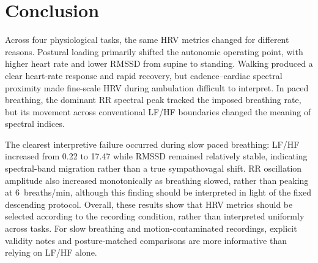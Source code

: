 \documentclass[conference]{IEEEtran}
\begin{document}
\section{Conclusion}
\label{sec:conclusion}

Across four physiological tasks, the same HRV metrics changed for
different reasons. Postural loading primarily shifted the autonomic
operating point, with higher heart rate and lower RMSSD from supine to
standing. Walking produced a clear heart-rate response and rapid
recovery, but cadence--cardiac spectral proximity made fine-scale HRV
during ambulation difficult to interpret. In paced breathing, the
dominant RR spectral peak tracked the imposed breathing rate, but its
movement across conventional LF/HF boundaries changed the meaning of
spectral indices.

The clearest interpretive failure occurred during slow paced breathing:
LF/HF increased from 0.22 to 17.47 while RMSSD remained relatively
stable, indicating spectral-band migration rather than a true
sympathovagal shift. RR oscillation amplitude also increased
monotonically as breathing slowed, rather than peaking at
6~breaths/min, although this finding should be interpreted in light of
the fixed descending protocol. Overall, these results show that HRV
metrics should be selected according to the recording condition,
rather than interpreted uniformly across tasks. For slow breathing and
motion-contaminated recordings, explicit validity notes and
posture-matched comparisons are more informative than relying on LF/HF
alone.
\end{document}
